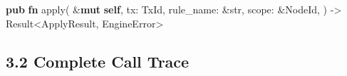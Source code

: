 \documentclass[11pt]{book}
\newenvironment{Shaded}{}{}
\newcommand{\DataTypeTok}[1]{\textcolor[rgb]{0.56,0.13,0.00}{#1}}
\newcommand{\KeywordTok}[1]{\textcolor[rgb]{0.00,0.44,0.13}{\textbf{#1}}}
\newcommand{\NormalTok}[1]{#1}
\newcommand{\OperatorTok}[1]{\textcolor[rgb]{0.40,0.40,0.40}{#1}}
\begin{document}
\begin{Shaded}
\begin{Highlighting}[]
\KeywordTok{pub} \KeywordTok{fn}\NormalTok{ apply(}
    \OperatorTok{\&}\KeywordTok{mut} \KeywordTok{self}\OperatorTok{,}
\NormalTok{    tx}\OperatorTok{:}\NormalTok{ TxId}\OperatorTok{,}
\NormalTok{    rule\_name}\OperatorTok{:} \OperatorTok{\&}\DataTypeTok{str}\OperatorTok{,}
\NormalTok{    scope}\OperatorTok{:} \OperatorTok{\&}\NormalTok{NodeId}\OperatorTok{,}
\NormalTok{) }\OperatorTok{{-}\textgreater{}} \DataTypeTok{Result}\OperatorTok{\textless{}}\NormalTok{ApplyResult}\OperatorTok{,}\NormalTok{ EngineError}\OperatorTok{\textgreater{}}
\end{Highlighting}
\end{Shaded}

\subsection{3.2 Complete Call Trace}\label{complete-call-trace-1}
\end{document}
